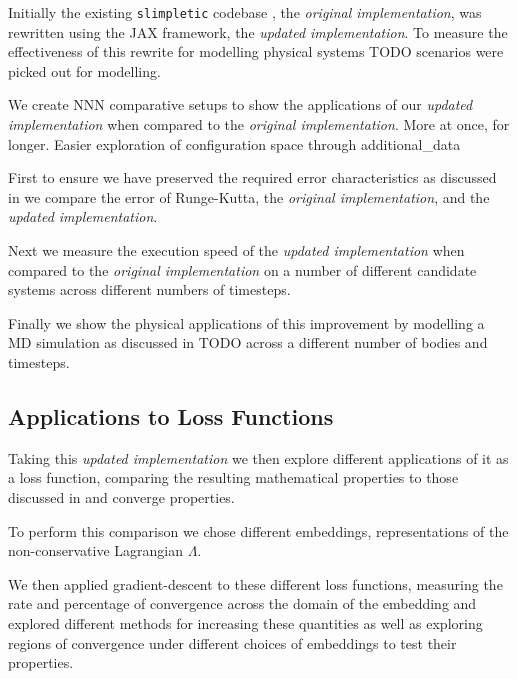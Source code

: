 \documentclass[10pt]{iopart}
\begin{document}
\newcommand{\orgimpl}{\textit{original implementation}}
\newcommand{\updimpl}{\textit{updated implementation}}

Initially the existing \texttt{slimpletic} codebase \cite{originalCode}, the \orgimpl{}, was rewritten using the JAX framework, the \updimpl{}. To measure the effectiveness of this rewrite for modelling physical systems TODO scenarios were picked out for modelling.

We create NNN comparative setups to show the applications of our \updimpl{} when compared to the \orgimpl{}. More at once, for longer. Easier exploration of configuration space through additional\_data

First to ensure we have preserved the required error characteristics as discussed in  we compare the error of Runge-Kutta, the \orgimpl{}, and the \updimpl{}.

Next we measure the execution speed of the \updimpl{} when compared to the \orgimpl{} on a number of different candidate systems across different numbers of timesteps.

Finally we show the physical applications of this improvement by modelling a MD simulation as discussed in TODO across a different number of bodies and timesteps.


\subsection{Applications to Loss Functions}

Taking this \updimpl{} we then explore different applications of it as a loss function, comparing the resulting mathematical properties to those discussed in  and converge properties.

To perform this comparison we chose different embeddings, representations of the non-conservative Lagrangian $\Lambda$.

We then applied gradient-descent\cite{gradientDescent} to these different loss functions, measuring the rate and percentage of convergence across the domain of the embedding and explored different methods for increasing these quantities as well as exploring regions of convergence under different choices of embeddings to test their properties.


\end{document}
